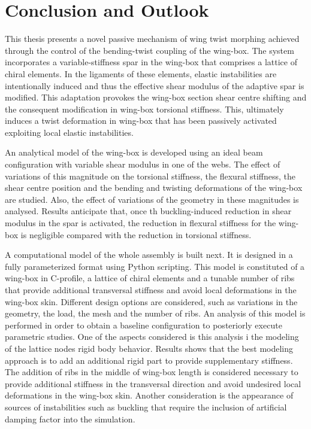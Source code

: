 \chapter{Conclusion and Outlook} \label{chap:summary}
%
%

This thesis presents a novel passive mechanism of wing twist morphing achieved through the control of the bending-twist coupling of the wing-box. The system incorporates a variable-stiffness spar in the wing-box that comprises a lattice of chiral elements. In the ligaments of these elements, elastic instabilities are intentionally induced and thus the effective shear modulus of the adaptive spar is modified. This adaptation provokes the wing-box section shear centre shifting and the consequent modification in wing-box torsional stiffness. This, ultimately induces a twist deformation in wing-box that has been passively activated exploiting local elastic instabilities.

An analytical model of the wing-box is developed using an ideal beam configuration with variable shear modulus in one of the webs. The effect of variations of this magnitude on the torsional stiffness, the flexural stiffness, the shear centre position and the bending and twisting deformations of the wing-box are studied. Also, the effect of variations of the geometry in these magnitudes is analysed. Results anticipate that, once th buckling-induced reduction in shear modulus in the spar is activated, the reduction in flexural stiffness for the wing-box is negligible compared with the reduction in torsional stiffness. 

A computational model of the whole assembly is built next. It is designed in a fully parameterized format using Python scripting. This model is constituted of a wing-box in C-profile, a lattice of chiral elements and a tunable number of ribs that provide additional transversal stiffness and avoid local deformations in the wing-box skin. Different design options are considered, such as variations in the geometry, the load, the mesh and the number of ribs. An analysis of this model is performed in order to obtain a baseline configuration to posteriorly execute parametric studies. One of the aspects considered is this analysis i the modeling of the lattice nodes rigid body behavior. Results shows that the best modeling approach is to add an additional rigid part to provide supplementary stiffness. The addition of ribs in the middle of wing-box length is considered necessary to provide additional stiffness in the transversal direction and avoid undesired local deformations in the wing-box skin. Another consideration is the appearance of sources of instabilities such as buckling that require the inclusion of artificial damping factor into the simulation. 

